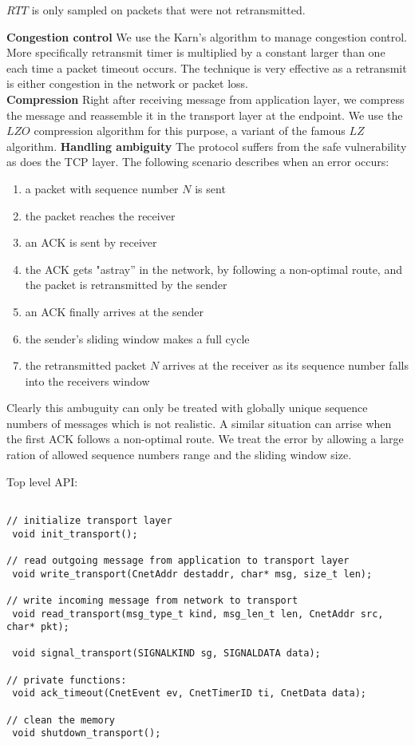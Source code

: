 \documentclass[11pt,a4paper,oneside]{report}
\begin{document}
$RTT$ is only sampled on packets that were not retransmitted. 

\noindent \textbf{Congestion control}
We use the Karn's algorithm to manage congestion control. More specifically
retransmit timer is multiplied by a constant larger than one each time a packet
timeout occurs. The technique is very effective as a retransmit is either
congestion in the network or packet loss. \\
\noindent \textbf{Compression}
Right after receiving message from application layer, we compress the message
and reassemble it in the transport layer at the endpoint. We use the $LZO$
compression algorithm for this purpose, a variant of the famous $LZ$ algorithm.
\noindent \textbf{Handling ambiguity}
The protocol suffers from the safe vulnerability as does the TCP layer. 
The following scenario describes when an error occurs:
\begin{enumerate}
\item a packet with sequence number $N$ is sent
\item the packet reaches the receiver
\item an ACK is sent by receiver
\item the ACK gets "astray'' in the network, by following a non-optimal route, and the packet is retransmitted by the sender
\item an ACK finally arrives at the sender
\item the sender's sliding window makes a full cycle
\item the retransmitted packet $N$ arrives at the receiver as its sequence number falls into the receivers window
\end{enumerate}

Clearly this ambuguity can only be treated with globally unique sequence numbers of messages which is not realistic.
A similar situation can arrise when the first ACK follows a non-optimal route. We treat the error by allowing
a large ration of allowed sequence numbers range and the sliding window size.

    \newpage
    Top level API:  
 \begin{lstlisting}

// initialize transport layer
 void init_transport();

// read outgoing message from application to transport layer
 void write_transport(CnetAddr destaddr, char* msg, size_t len);

// write incoming message from network to transport
 void read_transport(msg_type_t kind, msg_len_t len, CnetAddr src, char* pkt);

 void signal_transport(SIGNALKIND sg, SIGNALDATA data);

// private functions:
 void ack_timeout(CnetEvent ev, CnetTimerID ti, CnetData data);

// clean the memory
 void shutdown_transport();
  \end{lstlisting}
   
\end{document}
